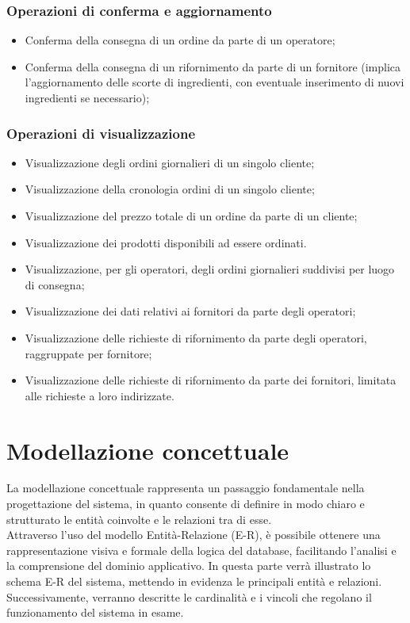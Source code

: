 \documentclass[12pt,a4paper]{article}
\begin{document}
    \subsubsection{Operazioni di conferma e aggiornamento}
    \begin{itemize}[leftmargin=1em]
        \item Conferma della consegna di un ordine da parte di un operatore;
        \item Conferma della consegna di un rifornimento da parte di un fornitore (implica l'aggiornamento delle scorte di ingredienti, con eventuale inserimento di nuovi ingredienti se necessario);
    \end{itemize}

    \subsubsection{Operazioni di visualizzazione}
    \begin{itemize}[leftmargin=1em]
        \item Visualizzazione degli ordini giornalieri di un singolo cliente;
        \item Visualizzazione della cronologia ordini di un singolo cliente;
        \item Visualizzazione del prezzo totale di un ordine da parte di un cliente;
        \item Visualizzazione dei prodotti disponibili ad essere ordinati.
        \item Visualizzazione, per gli operatori, degli ordini giornalieri suddivisi per luogo di consegna;
        \item Visualizzazione dei dati relativi ai fornitori da parte degli operatori;
        \item Visualizzazione delle richieste di rifornimento da parte degli operatori, raggruppate per fornitore;
        \item Visualizzazione delle richieste di rifornimento da parte dei fornitori, limitata alle richieste a loro indirizzate.
    \end{itemize}

    \newpage
    \section{Modellazione concettuale}
    La modellazione concettuale rappresenta un passaggio fondamentale nella progettazione del sistema, in quanto consente di definire in modo chiaro e strutturato le entità coinvolte e le relazioni tra di esse.\\
    Attraverso l'uso del modello Entità-Relazione (E-R), è possibile ottenere una rappresentazione visiva e formale della logica del database, facilitando l'analisi e la comprensione del dominio applicativo. In questa parte verrà illustrato lo schema E-R del sistema, mettendo in evidenza le principali entità e relazioni. Successivamente, verranno descritte le cardinalità e i vincoli che regolano il funzionamento del sistema in esame.
\end{document}
